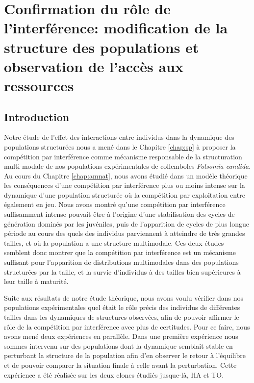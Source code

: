 \chapter{Confirmation du rôle de l'interférence: modification de la structure
des populations et observation de l'accès aux ressources}
\label{chap:sm}

\vspace{5cm}

\section{Introduction}

Notre étude de l'effet des interactions entre individus dans la  dynamique des
populations structurées nous a mené dans le Chapitre \ref{chap:sp} à proposer la
compétition par interférence comme mécanisme responsable de la structuration
multi-modale de nos populations expérimentales de collemboles \textit{Folsomia
candida}. Au cours du Chapitre \ref{chap:amnat}, nous avons étudié dans un
modèle théorique les conséquences d'une compétition par interférence plus ou
moins intense sur la dynamique d'une population structurée où la compétition par
exploitation entre également en jeu. Nous avons montré qu'une compétition par
interférence suffisamment intense pouvait être à l'origine d'une stabilisation
des cycles de génération dominés par les juvéniles, puis de l'apparition de
cycles de plus longue période au cours des quels des individus parviennent à
atteindre de très grandes tailles, et où la population a une structure
multimodale. Ces deux études semblent donc montrer que la compétition par
interférence est un mécanisme suffisant pour l'apparition de distributions
multimodales dans des populations structurées par la taille, et la survie
d'individus à des tailles bien supérieures à leur taille à maturité.

Suite aux résultats de notre étude théorique, nous avons voulu vérifier dans nos
populations expérimentales quel était le rôle précis des individus de
différentes tailles dans les dynamiques de structures observées, afin de pouvoir
affirmer le rôle de la compétition par interférence avec plus de certitudes.
Pour ce faire, nous avons mené deux expériences en parallèle. Dans une première
expérience nous sommes intervenu sur des populations dont la dynamique semblait
stable en perturbant la structure de la population afin d'en observer le retour
à l'équilibre et de pouvoir comparer la situation finale à celle avant la
perturbation. Cette expérience a été réalisée sur les deux clones étudiés
jusque-là, HA et TO.

